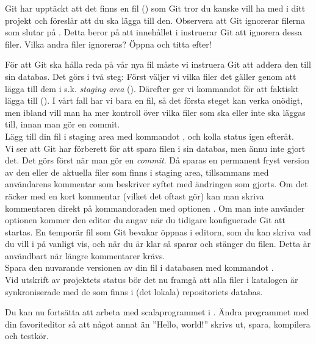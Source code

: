 \begin{Datorarbete}
	Git har upptäckt att det finns en fil () som Git tror du kanske vill ha med i ditt projekt och föreslår att du ska lägga till den. Observera att Git ignorerar filerna som slutar på . Detta beror på att innehållet i  instruerar Git att ignorera dessa filer. Vilka andra filer ignoreras? Öppna  och titta efter!

	För att Git ska hålla reda på vår nya fil måste vi instruera Git att addera den till sin databas. Det görs i två steg: Först väljer vi vilka filer det gäller genom att lägga till dem i s.k. \emph{staging area} (). Därefter ger vi kommandot för att faktiskt lägga till (). I vårt fall har vi bara en fil, så det första steget kan verka onödigt, men ibland vill man ha mer kontroll över vilka filer som ska eller inte ska läggas till, innan man gör en commit.
	\\

	\code{[\ref{git-add}]} Lägg till din fil i staging area med kommandot , och kolla status igen efteråt.
	\\

	Vi ser att Git har förberett för att spara filen i sin databas, men ännu inte gjort det. Det görs först när man gör en \emph{commit}. Då sparas en permanent fryst version av den eller de aktuella filer som finns i staging area, tillsammans med användarens kommentar som beskriver syftet med ändringen som gjorts. Om det räcker med en kort kommentar (vilket det oftast gör) kan man skriva kommentaren direkt på kommandoraden med optionen .
	Om man inte använder optionen  kommer den editor du angav när du tidigare konfiguerade Git att startas. En temporär fil som Git bevakar öppnas i editorn, som du kan skriva vad du vill i på vanligt vis, och när du är klar så sparar och stänger du filen. Detta är användbart när längre kommentarer krävs.
	\\

	\code{[\ref{git-commit}]} Spara den nuvarande versionen av din fil i databasen med kommandot .
	\\


	Vid utskrift av projektets status bör det nu framgå att alla filer i katalogen är synkroniserade med de som finns i (det lokala) repositoriets databas.

	Du kan nu fortsätta att arbeta med scalaprogrammet i . Ändra programmet med din favoriteditor så att något annat än ''Hello, world!'' skrivs ut, spara, kompilera och testkör.


\end{Datorarbete}
